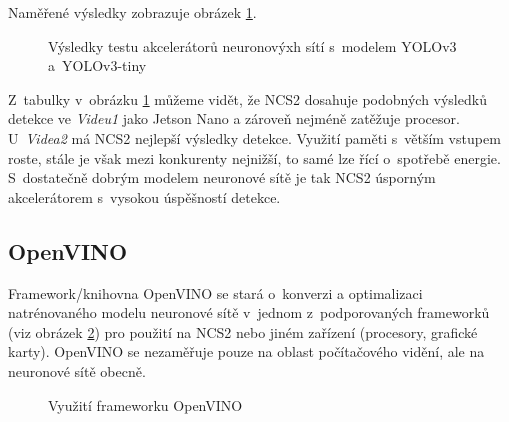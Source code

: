Naměřené výsledky zobrazuje obrázek \ref{obrazek:ncs2test}.

\begin{figure}[H]
  \begin{center}
  \label{obrazek:ncs2test}
  \caption{Výsledky testu akcelerátorů neuronovýxh sítí s~modelem YOLOv3 a~YOLOv3-tiny \cite{ncs2testYolo}}
  \end{center}
\end{figure}

Z~tabulky v~obrázku \ref{obrazek:ncs2test} můžeme vidět, že NCS2 dosahuje podobných výsledků detekce ve \emph{Videu1} jako Jetson Nano a zároveň nejméně zatěžuje procesor. U~\emph{Videa2} má NCS2 nejlepší výsledky detekce. Využití paměti s~větším vstupem roste, stále je však mezi konkurenty nejnižší, to samé lze řící o~spotřebě energie. S~dostatečně dobrým modelem neuronové sítě je tak NCS2 úsporným akcelerátorem s~vysokou úspěšností detekce.


\subsection*{OpenVINO}
Framework/knihovna OpenVINO se stará o~konverzi a optimalizaci natrénovaného modelu neuronové sítě v~jednom z~podporovaných frameworků (viz obrázek \ref{obrazek:ovchart}) pro použití na NCS2 nebo jiném zařízení (procesory, grafické karty). OpenVINO se nezaměřuje pouze na oblast počítačového vidění, ale na neuronové sítě obecně.

\begin{figure}[H]
  \begin{center}
  \label{obrazek:ovchart}
  \caption{Využití frameworku OpenVINO \cite{openvino}}
  \end{center}
\end{figure}

